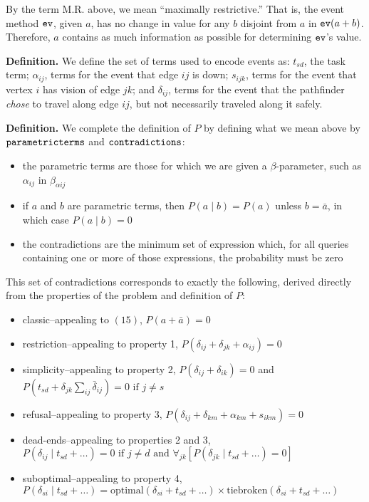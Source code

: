 \documentclass{article}
\begin{document}
By the term M.R. above, we mean ``maximally restrictive.'' That is, the
event method ${\tt ev}$, given $a$, has no change in value for any $b$
disjoint from $a$ in ${\tt ev}(a+b)$. Therefore, $a$ contains as much
information as possible for determining ${\tt ev}$'s value.

\textbf{Definition.} We define the set of terms used to encode events
as: $t_{sd}$, the task term; $\alpha_{ij}$, terms for the event that
edge $ij$ is down; $s_{ijk}$, terms for the event that vertex $i$ has
vision of edge $jk$; and $\delta_{ij}$, terms for the event that the
pathfinder \emph{chose} to travel along edge $ij$, but not necessarily
traveled along it safely.

\textbf{Definition.} We complete the definition of $P$ by defining what
we mean above by $\tt{parametric terms}$ and $\tt{contradictions}$:

\begin{itemize}
\itemsep1pt\parskip0pt
\item
  the parametric terms are those for which we are given a
  $\beta$-parameter, such as $\alpha_{ij}$ in $\beta_{\alpha ij}$
\item
  if $a$ and $b$ are parametric terms, then $P(a \mid b) = P(a)$ unless
  $b=\bar a$, in which case $P(a \mid b) = 0$
\item
  the contradictions are the minimum set of expression which, for all
  queries containing one or more of those expressions, the probability
  must be zero
\end{itemize}

This set of contradictions corresponds to exactly the following, derived
directly from the properties of the problem and definition of $P$:

\begin{itemize}
\itemsep1pt\parskip0pt
\item
  classic--appealing to $(15)$, $P(a + \bar a) = 0$
\item
  restriction--appealing to property 1,
  $P(\delta_{ij} + \delta_{jk} + \alpha_{ij}) = 0$
\item
  simplicity--appealing to property 2,
  $P(\delta_{ij} + \delta_{ik}) = 0$ and
  $P(t_{sd} + \delta_{jk} \sum_{ij} \bar \delta_{ij}) = 0 \text{ if } j \neq s$
\item
  refusal--appealing to property 3,
  $P(\delta_{ij} + \delta_{km} + \alpha_{km} + s_{ikm}) = 0$
\item
  dead-ends--appealing to properties 2 and 3,
  $P(\delta_{ij} \mid t_{sd} + \dots) = 0 \text{ if } j \neq d \text{ and } \forall_{jk} \left[ P(\delta_{jk} \mid t_{sd} + \dots) = 0 \right]$
\item
  suboptimal--appealing to property 4,
  $P(\delta_{si} \mid t_{sd} + \dots) = \text{optimal}(\delta_{si} + t_{sd} + \dots) \times \text{tiebroken}(\delta_{si} + t_{sd} + \dots)$
\end{itemize}
\end{document}
